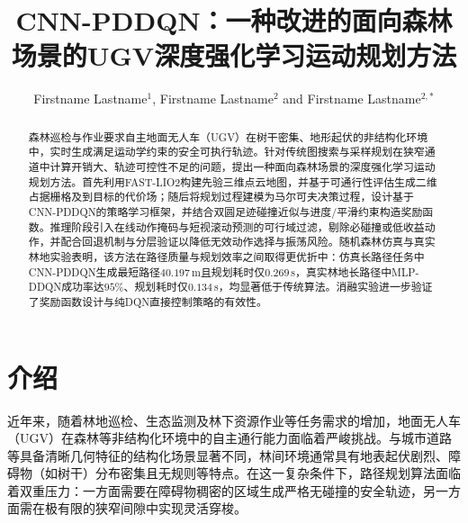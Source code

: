 \documentclass{iopjournal}
\begin{document}

\title{CNN-PDDQN：一种改进的面向森林场景的UGV深度强化学习运动规划方法}

\author{Firstname Lastname$^1$, Firstname Lastname$^2$ and Firstname Lastname$^{2,*}$}






\begin{abstract}
森林巡检与作业要求自主地面无人车（UGV）在树干密集、地形起伏的非结构化环境中，实时生成满足运动学约束的安全可执行轨迹。针对传统图搜索与采样规划在狭窄通道中计算开销大、轨迹可控性不足的问题，提出一种面向森林场景的深度强化学习运动规划方法。首先利用FAST-LIO2构建先验三维点云地图，并基于可通行性评估生成二维占据栅格及到目标的代价场；随后将规划过程建模为马尔可夫决策过程，设计基于CNN-PDDQN的策略学习框架，并结合双圆足迹碰撞近似与进度/平滑约束构造奖励函数。推理阶段引入在线动作掩码与短视滚动预测的可行域过滤，剔除必碰撞或低收益动作，并配合回退机制与分层验证以降低无效动作选择与振荡风险。随机森林仿真与真实林地实验表明，该方法在路径质量与规划效率之间取得更优折中：仿真长路径任务中CNN-PDDQN生成最短路径$40.197$\,m且规划耗时仅$0.269$\,s，真实林地长路径中MLP-DDQN成功率达$95\%$、规划耗时仅$0.134$\,s，均显著低于传统算法。消融实验进一步验证了奖励函数设计与纯DQN直接控制策略的有效性。
\end{abstract}


\section{介绍}\label{sec:intro}

近年来，随着林地巡检、生态监测及林下资源作业等任务需求的增加，地面无人车（UGV）在森林等非结构化环境中的自主通行能力面临着严峻挑战。与城市道路等具备清晰几何特征的结构化场景显著不同，林间环境通常具有地表起伏剧烈、障碍物（如树干）分布密集且无规则等特点。在这一复杂条件下，路径规划算法面临着双重压力：一方面需要在障碍物稠密的区域生成严格无碰撞的安全轨迹，另一方面需在极有限的狭窄间隙中实现灵活穿梭。
\end{document}
